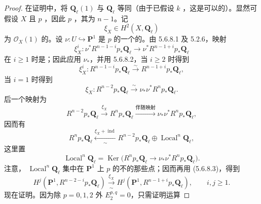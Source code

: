\begin{proof}
在证明中，将 $\mathbf Q_\ell(1)$ 与 $\mathbf Q_\ell$ 等同（由于已假设 $k$ ，这是可以的）。显然可假设 $X$ 且 $p$ ，因此 $p$ ，其为 $n-1$。记
\[\xi_X\in H^2(X,\mathbf Q_\ell)\]
为 $\mathscr O_X(1)$ 的。设 $\nu:U\hookrightarrow\mathbf P^1$ 是 $p$ 的一个的。由 5.6.8.1 及 5.2.6，映射
\[\xi_X^i:\nu^*R^{n-1-i}p_*\mathbf Q_\ell\longrightarrow\nu^*R^{n-1+i}p_*\mathbf Q_\ell\]
在 $i\geq1$ 时是；因此应用 $\nu_*$，并用 5.6.8.2，当 $i\geq2$ 时得到
\begin{equation}\tag{5.6.8.3}\xi_X^i:R^{n-1-i}p_*\mathbf Q_\ell\xrightarrow{\sim}R^{n-1+i}p_*\mathbf Q_\ell,\end{equation}
当 $i=1$ 时得到
\begin{equation}\tag{5.6.8.4}\xi_X:R^{n-2}p_*\mathbf Q_\ell\xrightarrow{\sim}\nu_*\nu^*R^np_*\mathbf Q_\ell.\end{equation}
后一个映射为
\begin{equation}\tag{5.6.8.5}R^{n-2}p_*\mathbf Q_\ell\xrightarrow{\xi_X}R^np_*\mathbf Q_\ell\xrightarrow{\text{伴随映射}}\nu_*\nu^*R^np_*\mathbf Q_\ell,\end{equation}
因而有
\begin{equation}\tag{5.6.8.6}R^np_*\mathbf Q_\ell\xleftarrow[\sim]{\xi_X+\operatorname{ind}}R^{n-2}p_*\mathbf Q_\ell\oplus\operatorname{Local}^n\mathbf Q_\ell,\end{equation}
这里置
\begin{equation}\tag{5.6.8.7}\operatorname{Local}^n\mathbf Q_\ell=\operatorname{Ker}\bigl(R^np_*\mathbf Q_\ell\to\nu_*\nu^*R^np_*\mathbf Q_\ell\bigr).\end{equation}
注意， $\operatorname{Local}^n\mathbf Q_\ell$ 集中在 $\mathbf P^1$ 上 $p$ 的不的那些点；因而再用 (5.6.8.3)，得到
\begin{equation}\tag{5.6.8.8}H^j(\mathbf P^1,R^{n-2-i}p_*\mathbf Q_\ell)\xrightarrow[\sim]{\xi_X}H^j(\mathbf P^1,R^{n-1+i}p_*\mathbf Q_\ell),\qquad i,j\geq1.\end{equation}
现在证明。因为除 $p=0,1,2$ 外 $E_2^{p,q}=0$，只需证明运算

\end{proof}
